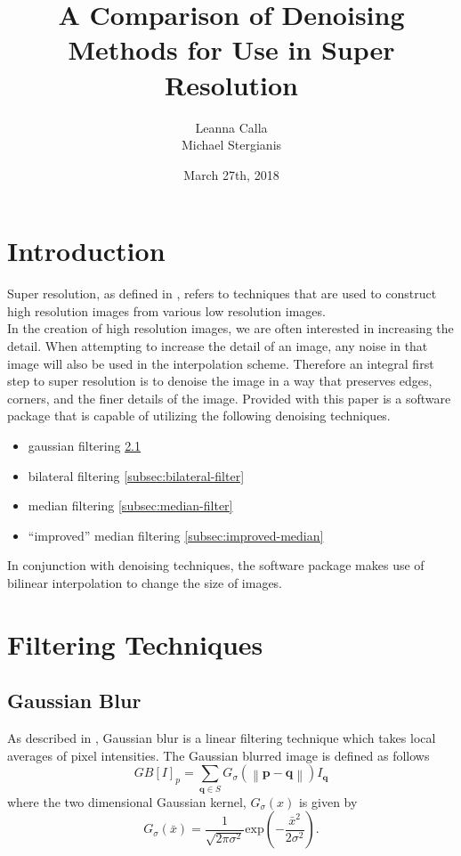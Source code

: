 \documentclass{article}
\title{A Comparison of Denoising Methods for Use in Super Resolution}
\author{Leanna Calla \\ Michael Stergianis}
\date{March 27th, 2018}
\newcommand{\norm}[1]{\left\| #1 \right\|}
\begin{document}
\maketitle
%
%
\section{Introduction}
\label{sec:introduction}
Super resolution, as defined in \cite{Yang}, refers to techniques that
are used to construct high resolution images from various low
resolution images. \\

In the creation of high resolution images, we are often interested in
increasing the detail. When attempting to increase the detail of an image, any noise in
that image will also be used in the interpolation scheme. Therefore
an integral first step to super resolution is to denoise the image
in a way that preserves edges, corners, and the finer details of the
image.
%
Provided with this paper is a software package that is capable of
utilizing the following denoising techniques.
\begin{itemize}
  \item gaussian filtering \ref{subsec:gauss-blur}
  \item bilateral filtering \ref{subsec:bilateral-filter}
  \item median filtering \ref{subsec:median-filter}
  \item ``improved'' median filtering \ref{subsec:improved-median}
\end{itemize}
%
In conjunction with denoising techniques, the software package makes
use of bilinear interpolation to change the size of images.
%
\section{Filtering Techniques}
\label{sec:filter-tech}
\subsection{Gaussian Blur}
\label{subsec:gauss-blur}
As described in \cite{bilateral}, Gaussian blur is a linear filtering
technique which takes local averages of pixel intensities. The
Gaussian blurred image is defined as follows
\[GB[I]_p = \displaystyle \sum_{\textbf{q} \in S}G_{\sigma} \left(
    \norm{\textbf{p} - \textbf{q}}\right)I_{\textbf{q}} \]
where the two dimensional Gaussian kernel, $G_{\sigma}(x)$ is given by
\[G_{\sigma}(\bar{x}) = \frac{1}{\sqrt{2 \pi \sigma^2}} \text{exp} \left(-
    \frac{\bar{x}^2}{2 \sigma^2}\right). \]
%
\end{document}

